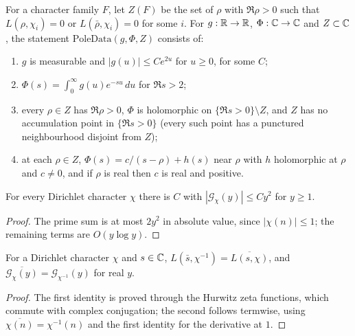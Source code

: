 \begin{definition}\label{an:poledata}
For a character family $F$, let $Z(F)$ be the set of $\rho$ with
$\Re\rho>0$ such that $L(\rho,\chi_i)=0$ or $L(\bar\rho,\chi_i)=0$ for
some $i$. For $g:\mathbb{R}\to\mathbb{R}$, $\Phi:\mathbb{C}\to\mathbb{C}$ and $Z\subset\mathbb{C}$, the
statement $\mathrm{PoleData}(g,\Phi,Z)$ consists of:
\begin{enumerate}
\item $g$ is measurable and $|g(u)|\le Ce^{2u}$ for $u\ge0$, for some $C$;
\item $\Phi(s)=\int_0^{\infty} g(u)e^{-su}\,du$ for $\Re s>2$;
\item every $\rho\in Z$ has $\Re\rho>0$, $\Phi$ is holomorphic on
$\{\Re s>0\}\setminus Z$, and $Z$ has no accumulation point in
$\{\Re s>0\}$ (every such point has a punctured neighbourhood disjoint
from $Z$);
\item at each $\rho\in Z$, $\Phi(s)=c/(s-\rho)+h(s)$ near $\rho$ with
$h$ holomorphic at $\rho$ and $c\ne0$, and if $\rho$ is real then $c$ is
real and positive.
\end{enumerate}
\end{definition}

\begin{lemma}[Growth]\label{an:gchi-growth}
For every Dirichlet character $\chi$ there is $C$ with
$|\mathcal G_{\chi}(y)|\le Cy^2$ for $y\ge1$.
\end{lemma}
\begin{proof}
The prime sum is at most $2y^2$ in absolute value, since $|\chi(n)|\le1$;
the remaining terms are $O(y\log y)$.
\end{proof}

\begin{lemma}[Conjugation]\label{an:gchi-conj}
For a Dirichlet character $\chi$ and $s\in\mathbb{C}$,
$L(\bar s,\chi^{-1})=\overline{L(s,\chi)}$, and
$\overline{\mathcal G_{\chi}(y)}=\mathcal G_{\chi^{-1}}(y)$ for real $y$.
\end{lemma}
\begin{proof}
The first identity is proved through the Hurwitz zeta functions, which
commute with complex conjugation; the second follows termwise, using
$\overline{\chi(n)}=\chi^{-1}(n)$ and the first identity for the
derivative at $1$.
\end{proof}

